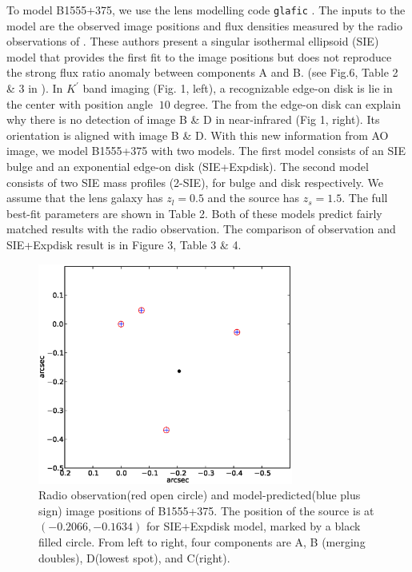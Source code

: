 \documentclass[usenatbib]{mn2e}
\begin{document}
To model B1555+375, we use the lens modelling code {\tt glafic}
\citep{Oguri}.  The inputs to the model are the observed image positions
and flux densities measured by the radio observations of \citet{Marlow}.
These authors present a singular isothermal ellipsoid (SIE) model that
provides the first fit to the image positions but
does not reproduce the strong flux ratio anomaly between components A and B.
(see Fig.6, Table 2 \& 3 in \citet{Marlow}). In $K^\prime$ band
imaging (Fig. 1, left), a recognizable edge-on disk is lie in the center
with position angle $~10$ degree. The from the edge-on disk can explain why there is no detection of image B \& D in near-infrared (Fig 1, right). Its orientation is aligned with image B \& D. With this new information from AO image, we model
B1555+375 with two models. The first model consists of an SIE bulge
and an exponential edge-on disk (SIE+Expdisk). The second model
consists of two SIE mass profiles (2-SIE), for bulge and disk
respectively. We assume that the lens galaxy has $z_{l}=0.5$ and the source has $z_s=1.5$. The full best-fit parameters are shown in Table 2. Both
of these models predict fairly matched results with the radio
observation. The comparison of observation and SIE+Expdisk result is
in Figure 3, Table 3 \& 4.


\begin{figure}
\includegraphics[width=84mm]{point_source.eps}
\caption{Radio observation(red open circle) and model-predicted(blue plus sign) image positions of B1555+375. The position of the source is at $(-0.2066,-0.1634)$ for SIE+Expdisk model, marked by a black filled circle. From left to right, four components are A, B (merging doubles), D(lowest spot), and C(right).\label{fig2}}
\end{figure}
\end{document}
